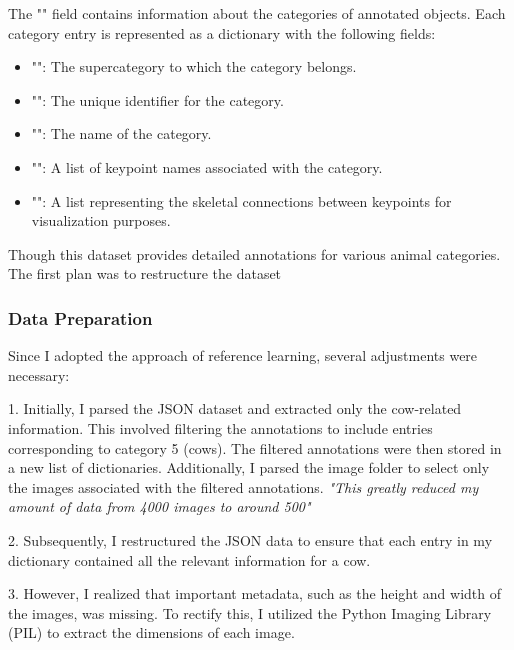 The "" field contains information about the categories of annotated objects. Each category entry is represented as a dictionary with the following fields:
\begin{itemize}
    \item "": The supercategory to which the category belongs.
    \item "": The unique identifier for the category.
    \item "": The name of the category.
    \item "": A list of keypoint names associated with the category.
    \item "": A list representing the skeletal connections between keypoints for visualization purposes.
\end{itemize}
Though this dataset provides detailed annotations for various animal categories. The first plan was to restructure the dataset
\newpage
\subsubsection{Data Preparation}
Since I adopted the approach of reference learning, several adjustments were necessary:

1. Initially, I parsed the JSON dataset and extracted only the cow-related information. This involved filtering the annotations to include entries corresponding to category 5 (cows). The filtered annotations were then stored in a new list of dictionaries. Additionally, I parsed the image folder to select only the images associated with the filtered annotations.
\textit{"This greatly reduced my amount of data from 4000 images to around 500"}

2. Subsequently, I restructured the JSON data to ensure that each entry in my dictionary contained all the relevant information for a cow.

3. However, I realized that important metadata, such as the height and width of the images, was missing. To rectify this, I utilized the Python Imaging Library (PIL) to extract the dimensions of each image.

